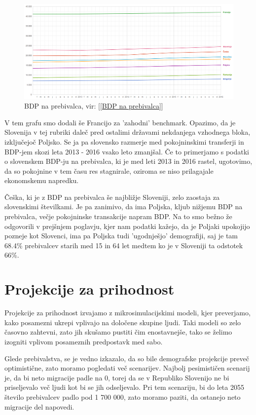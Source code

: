 \documentclass[12pt, a4paper]{article}
\begin{document}
\begin{figure}[h!]
\centering
\includegraphics[width = 13 cm]{bdp_per_capita.png}
\caption{BDP na prebivalca, vir: [\ref{BDP na prebivalca}]}
\label{Slika 9}
\end{figure}

\newpage
V tem grafu smo dodali še Francijo za 'zahodni' benchmark. Opazimo, da je Slovenija v tej rubriki daleč pred ostalimi državami nekdanjega vzhodnega bloka, izključejoč Poljsko. Se ja pa slovensko razmerje med pokojninskimi transferji in BDP-jem skozi leta 2013 - 2016 vsako leto zmanjšal. Če to primerjamo s podatki o slovenskem BDP-ju na prebivalca, ki je med leti 2013 in 2016 rastel, ugotovimo, da so pokojnine v tem času res stagnirale, oziroma se niso prilagajale ekonomskemu napredku.

Češka, ki je z BDP na prebivalca še najbližje Sloveniji, zelo zaostaja za slovenskimi številkami. Je pa zanimivo, da ima Poljska, kljub nižjemu BDP na prebivalca, večje pokojninske transakcije napram BDP. Na to smo bežno že odgovorili v prejšnjem poglavju, kjer nam podatki kažejo, da je Poljaki upokojijo pozneje kot Slovenci, ima pa Poljska tudi 'ugodnješjo' demografiji, saj je tam 68.4\% prebivalcev starih med 15 in 64 let medtem ko je v Sloveniji ta odstotek 66\%.

\newpage

\section[Projekcije za prihodnost]{Projekcije za prihodnost}

Projekcije za prihodnost izvajamo z mikrosimulacijskimi modeli, kjer preverjamo, kako posamezni ukrepi vplivajo na določene skupine ljudi. Taki modeli so zelo časovno zahtevni, zato jih skušamo pustiti čim enostavnejše, tako se želimo izogniti vplivom posameznih predpostavk med sabo.

\hspace*{5mm} Glede prebivalstva, se je vedno izkazalo, da so bile demografske projekcije preveč optimistične, zato moramo pogledati več scenarijev. Najbolj pesimističen scenarij je, da bi neto migracije padle na 0, torej da se v Republiko Slovenijo ne bi priseljevalo več ljudi kot bi se jih odseljevalo. Pri tem scenariju, bi do leta 2055 število prebivalcev padlo pod 1 700 000, zato moramo paziti, da ostanejo neto migracije del napovedi.
\end{document}
